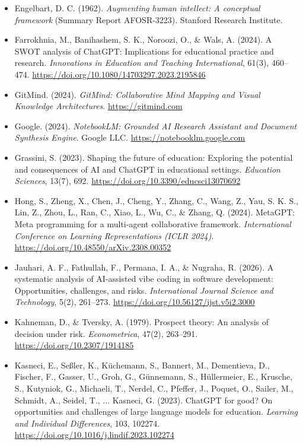 \begin{itemize}[leftmargin=1.5em, label={}, itemsep=0.22ex, parsep=0pt]
    \item Engelbart, D. C. (1962). \textit{Augmenting human intellect: A conceptual framework} (Summary Report AFOSR-3223). Stanford Research Institute.
    \item Farrokhnia, M., Banihashem, S. K., Noroozi, O., \& Wals, A. (2024). A SWOT analysis of ChatGPT: Implications for educational practice and research. \textit{Innovations in Education and Teaching International}, 61(3), 460--474. \url{https://doi.org/10.1080/14703297.2023.2195846}
    \item GitMind. (2024). \textit{GitMind: Collaborative Mind Mapping and Visual Knowledge Architectures}. \url{https://gitmind.com}
    \item Google. (2024). \textit{NotebookLM: Grounded AI Research Assistant and Document Synthesis Engine}. Google LLC. \url{https://notebooklm.google.com}
    \item Grassini, S. (2023). Shaping the future of education: Exploring the potential and consequences of AI and ChatGPT in educational settings. \textit{Education Sciences}, 13(7), 692. \url{https://doi.org/10.3390/educsci13070692}
    \item Hong, S., Zheng, X., Chen, J., Cheng, Y., Zhang, C., Wang, Z., Yau, S. K. S., Lin, Z., Zhou, L., Ran, C., Xiao, L., Wu, C., \& Zhang, Q. (2024). MetaGPT: Meta programming for a multi-agent collaborative framework. \textit{International Conference on Learning Representations (ICLR 2024)}. \url{https://doi.org/10.48550/arXiv.2308.00352}
    \item Jauhari, A. F., Fathullah, F., Permana, I. A., \& Nugraha, R. (2026). A systematic analysis of AI-assisted vibe coding in software development: Opportunities, challenges, and risks. \textit{International Journal Science and Technology}, 5(2), 261--273. \url{https://doi.org/10.56127/ijst.v5i2.3000}
    \item Kahneman, D., \& Tversky, A. (1979). Prospect theory: An analysis of decision under risk. \textit{Econometrica}, 47(2), 263--291. \url{https://doi.org/10.2307/1914185}
    \item Kasneci, E., Se{\ss}ler, K., K{\"u}chemann, S., Bannert, M., Dementieva, D., Fischer, F., Gasser, U., Groh, G., G{\"u}nnemann, S., H{\"u}llermeier, E., Krusche, S., Kutyniok, G., Michaeli, T., Nerdel, C., Pfeffer, J., Poquet, O., Sailer, M., Schmidt, A., Seidel, T., ... Kasneci, G. (2023). ChatGPT for good? On opportunities and challenges of large language models for education. \textit{Learning and Individual Differences}, 103, 102274. \url{https://doi.org/10.1016/j.lindif.2023.102274}

\end{itemize}

